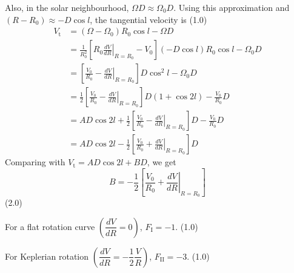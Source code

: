 \begin{description}
  Also, in the solar neighbourhood, $\Omega D \approx \Omega_0 D$. Using this
  approximation and $(R - R_0) \approx -D\cos l$, the tangential velocity is
  \hfill(1.0)
  \begin{align*}
    V_{\mathrm{t}} &= (\Omega - \Omega_0)R_0\cos l - \Omega D\\
      &= \frac{1}{R_0^2}
         \left[R_0\left.\frac{dV}{dR}\right|_{R=R_0} - V_0\right]
         (-D\cos l)R_0\cos l - \Omega_0 D\\
      &= \left[\frac{V_0}{R_0}
         - \left.\frac{dV}{dR}\right|_{R=R_0}\right]D\cos^2 l - \Omega_0 D\\
      &= \frac{1}{2}\left[\frac{V_0}{R_0}
         - \left.\frac{dV}{dR}\right|_{R=R_0}\right]D(1 + \cos 2l)
         - \frac{V_0}{R_0}D\\
      &= AD\cos 2l
         + \frac{1}{2}\left[\frac{V_0}{R_0}
         - \left.\frac{dV}{dR}\right|_{R=R_0}\right]D - \frac{V_0}{R_0}D\\
      &= AD\cos 2l
         - \frac{1}{2}\left[\frac{V_0}{R_0}
         + \left.\frac{dV}{dR}\right|_{R=R_0}\right]D
  \end{align*}
  Comparing with $V_{\mathrm{t}} = AD\cos 2l + BD$, we get
  \[
    B = -\frac{1}{2}
        \left[\frac{V_0}{R_0} + \left.\frac{dV}{dR}\right|_{R=R_0}\right]
  \]
  \hfill(2.0)
\item[(T06.3c)] For a flat rotation curve
  $\left(\dfrac{dV}{dR} = 0\right)$, $F_{\mathrm{I}} = -1$. \hfill(1.0)

  For Keplerian rotation
  $\left(\dfrac{dV}{dR} = -\dfrac{1}{2}\dfrac{V}{R}\right)$,
  $F_{\mathrm{II}} = -3$. \hfill(1.0)
\end{description}

